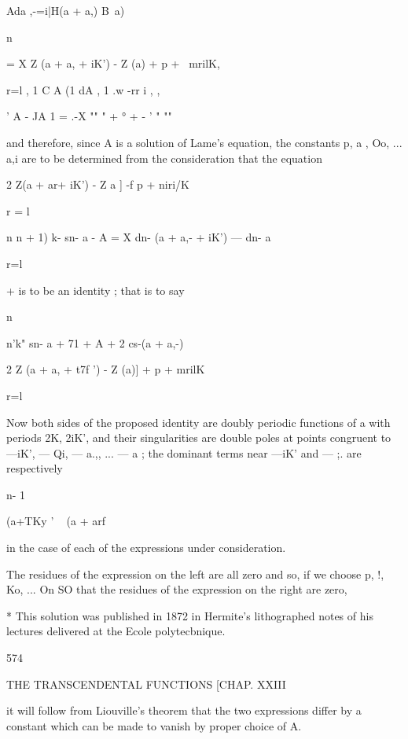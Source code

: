{{{{{{{{Ada ,-=i|H(a + a,) B\ a)\ \    

n 

= X  Z (a + a, + iK') - Z (a)  + p + \ mrilK, 

r=l 
,   1 C A (1 dA    , 1 .w -rr  i , , 

   ' A   - JA  1 = .-X  ""  " + °  +    - '  " "" 

and therefore, since A is a solution of Lame's equation, the constants p, a , 
Oo, ... a,i are to be determined from the consideration that the equation 



2  Z(a + ar+ iK') - Z  a ] -f p +   niri/K 

r = l 



n  n + 1) k- sn- a -  A = X  dn- (a + a,- + iK') — dn- a 

r=l 

+ 
is to be an identity ; that is to say 

n 

n'k" sn- a + 71 + A + 2 cs-(a + a,-) 

2  Z (a + a, + t7f ') - Z (a)] + p + mrilK 



r=l 



Now both sides of the proposed identity are doubly periodic functions of 
a with periods 2K, 2iK', and their singularities are double poles at points 
congruent to —iK', — Qi, — a.,, ... — a ; the dominant terms near —iK' and 
—  ;. are respectively 

n- 1 

(a+TKy ' ~ (a + arf 

in the case of each of the expressions under consideration. 

The residues of the expression on the left are all zero and so, if we choose 
p,  !, Ko, ... On SO that the residues of the expression on the right are zero, 

* This solution was published in 1872 in Hermite's lithographed notes of his lectures delivered 
at the Ecole polytecbnique. 



574 



THE TRANSCENDENTAL FUNCTIONS [CHAP. XXIII 



it will follow from Liouville's theorem that the two expressions differ by a 
constant which can be made to vanish by proper choice of A. 

}}}}}}}}
